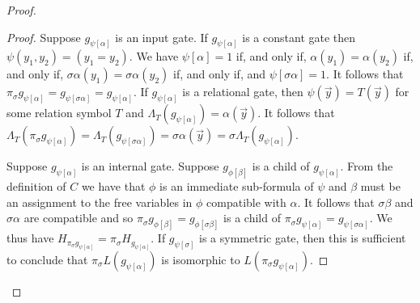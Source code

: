\documentclass[../main/thesis.tex]{subfiles}
\begin{document}
\begin{proof}
\begin{proof}
  Suppose $g_{\psi[\alpha]}$ is an input gate. If $g_{\psi[\alpha]}$ is a
  constant gate then $\psi (y_1, y_2) = (y_1 = y_2)$. We have $\psi[\alpha] = 1$
  if, and only if, $\alpha(y_1) = \alpha(y_2)$ if, and only if, $\sigma \alpha
  (y_1) = \sigma \alpha(y_2)$ if, and only if, and $\psi[\sigma \alpha] = 1$. It
  follows that $\pi_\sigma g_{\psi[\alpha]} = g_{\psi[\sigma \alpha]} =
  g_{\psi[\alpha]}$. If $g_{\psi[\alpha]}$ is a relational gate, then $\psi
  (\vec{y}) = T(\vec{y})$ for some relation symbol $T$ and $\Lambda_T
  (g_{\psi[\alpha]}) = \alpha (\vec{y})$. It follows that $\Lambda_T
  (\pi_{\sigma} g_{\psi[\alpha]}) = \Lambda_T( g_{\psi[\sigma \alpha]}) = \sigma
  \alpha (\vec{y}) = \sigma \Lambda_T (g_{\psi[\alpha]})$.
  
  Suppose $g_{\psi[\alpha]}$ is an internal gate. Suppose $g_{\phi[\beta]}$ is a
  child of $g_{\psi[\alpha]}$. From the definition of $C$ we have that $\phi$ is
  an immediate sub-formula of $\psi$ and $\beta$ must be an assignment to the
  free variables in $\phi$ compatible with $\alpha$. It follows that
  $\sigma\beta$ and $\sigma\alpha$ are compatible and so $\pi_\sigma
  g_{\phi[\beta]} = g_{\phi[\sigma\beta]}$ is a child of
  $\pi_{\sigma}g_{\psi[\alpha]} = g_{\psi[\sigma \alpha]}$. We thus have
  $H_{\pi_\sigma g_{\psi[\alpha]}} = \pi_\sigma H_{g_{\psi[\alpha]}}$. If
  $g_{\psi[\sigma]}$ is a symmetric gate, then this is sufficient to conclude
  that $\pi_{\sigma} L(g_{\psi [\alpha]})$ is isomorphic to $L(\pi_{\sigma}
  g_{\psi[\alpha]})$.


\end{proof}
\end{proof}
\end{document}
